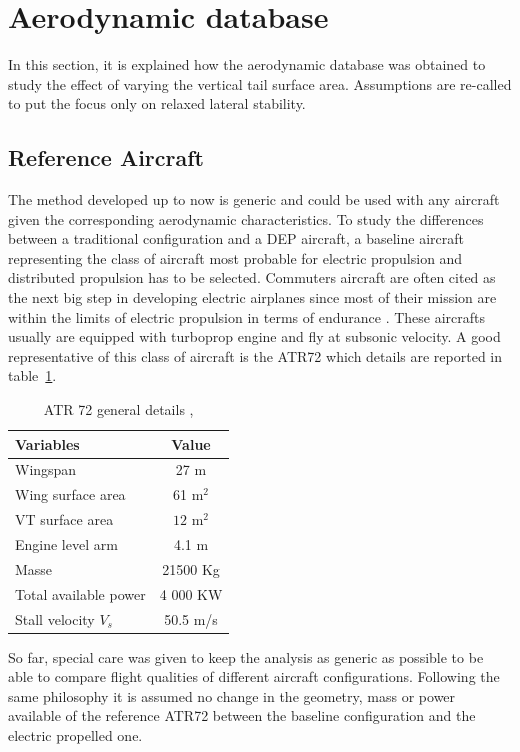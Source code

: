 \section{Aerodynamic database}
In this section, it is explained how the aerodynamic database was obtained to study the effect of varying the vertical tail surface area. Assumptions are re-called to put the focus only on relaxed lateral stability.

\subsection{Reference Aircraft}
The method developed up to now is generic and could be used with any aircraft given the corresponding aerodynamic characteristics. To study the differences between a traditional configuration and a DEP aircraft, a baseline aircraft representing the class of aircraft most probable for electric propulsion and distributed propulsion has to be selected. Commuters aircraft are often cited as the next big step in developing electric airplanes since most of their mission are within the limits of electric propulsion in terms of endurance \cite{MisconceptionMoore} \cite{StucklMethodsDesignElectriProp}. These aircrafts usually are equipped with turboprop engine and fly at subsonic velocity. A good representative of this class of aircraft is the ATR72 which details are reported in table~\ref{tab:nominalset}.

\begin{table}[hbt!]
	\caption{\label{tab:nominalset} ATR 72 general details \cite{ATRFAAtypecertificate}, \cite{JanesAircraft}}
	\centering
	\begin{tabular}{l|c}
		Variables & Value\\
		\hline
		Wingspan & 27 m\\
		Wing surface area & 61 m$^2$\\ 
		VT surface area & $12$ $\textrm{m}^2$\\
		Engine level arm & 4.1 m\\
		Masse & 21500 Kg\\
		Total available power & 4 000 KW\\
		Stall velocity $V_s$ & 50.5 m/s\\
	\end{tabular}
\end{table}

So far, special care was given to keep the analysis as generic as possible to be able to compare flight qualities of different aircraft configurations. Following the same philosophy it is assumed no change in the geometry, mass or power available of the reference ATR72 between the baseline configuration and the electric propelled one.

